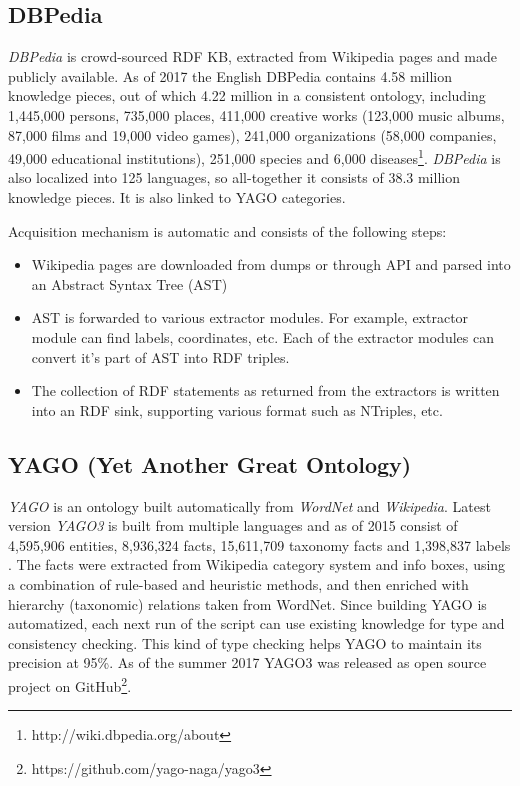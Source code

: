\subsection{DBPedia}
\label{section:r:dbpedia}
\emph{DBPedia} is crowd-sourced RDF KB, extracted from Wikipedia pages and made
publicly available\parencite{Lehmann2015}. As of 2017 the English DBPedia 
contains 4.58 million 
knowledge pieces, out of which 4.22 million in a consistent ontology, 
including 1,445,000 persons, 735,000 places, 411,000 creative works
(123,000 music albums, 87,000 films and 19,000 video games), 
241,000 organizations (58,000 companies, 49,000 educational institutions), 
251,000 species and 6,000 diseases\footnote{http://wiki.dbpedia.org/about}.
\emph{DBPedia} is also localized into 125 languages, so all-together it 
consists of 38.3 million knowledge pieces. It is also linked to YAGO categories.

Acquisition mechanism is automatic and consists of the following steps:
\begin{itemize}
\item Wikipedia pages are downloaded from dumps or through API and parsed into
an Abstract Syntax Tree (AST)
\item  AST is forwarded to various extractor modules. For example, extractor
module can find labels, coordinates, etc. Each of the extractor modules can
convert it's part of AST into RDF triples.
\item The collection of RDF statements as returned from the extractors is 
written into an RDF sink, supporting various format such as NTriples, etc.
\end{itemize}

\subsection{YAGO (Yet Another Great Ontology)}
\label{section:r:yago}
\emph{YAGO} is an ontology built automatically from \emph{WordNet} and 
\emph{Wikipedia}\parencite{Suchanek2008}. Latest version \emph{YAGO3} is built
from multiple languages and as of 2015 consist of 4,595,906 entities, 
8,936,324 facts, 15,611,709 taxonomy facts and 1,398,837 labels
\parencite{Mahdisoltani2015}.
The facts were extracted from Wikipedia category system and info boxes, using
a combination of rule-based and heuristic methods, and then enriched with 
hierarchy (taxonomic) relations taken from WordNet. Since building
YAGO is automatized, each next run of the script can use existing knowledge
for type and consistency checking. This kind of type checking helps YAGO to
maintain its precision at 95\%\parencite{Suchanek2008}. As of the summer 2017
YAGO3\parencite{Rebele2016} was released as open source project on 
GitHub\footnote{https://github.com/yago-naga/yago3}.

